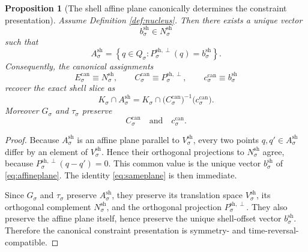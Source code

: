 \documentclass[11pt]{article}
\newcommand{\CoordSpace}[1]{Q_{#1}}
\newcommand{\CoordBody}[1]{K_{#1}}
\newcommand{\ConstraintTarget}[1]{E_{#1}}
\newcommand{\ConstraintMap}[1]{C_{#1}}
\newcommand{\ConstraintValue}[1]{c_{#1}}
\newcommand{\SymGroup}[1]{G_{#1}}
\newcommand{\TimeRev}[1]{\tau_{#1}}
\newcommand{\ShellAffine}[1]{A_{#1}^{\mathrm{sh}}}
\newcommand{\ShellDir}[1]{V_{#1}^{\mathrm{sh}}}
\newcommand{\ShellNormal}[1]{N_{#1}^{\mathrm{sh}}}
\newcommand{\ShellProj}[1]{P_{#1}^{\mathrm{sh},\perp}}
\newcommand{\ShellOffset}[1]{b_{#1}^{\mathrm{sh}}}
\newtheorem{proposition}{Proposition}
\begin{document}
\begin{proposition}[The shell affine plane canonically determines the constraint presentation]
\label{prop:constraint}
Assume Definition \ref{def:nucleus}. Then there exists a unique vector
\[
\ShellOffset{\sigma}\in\ShellNormal{\sigma}
\]
such that
\begin{equation}
\ShellAffine{\sigma}
=
\left\{
q\in\CoordSpace{\sigma}:
\ShellProj{\sigma}(q)=\ShellOffset{\sigma}
\right\}.
\label{eq:affineplane}
\end{equation}
Consequently, the canonical assignments
\begin{equation}
\ConstraintTarget{\sigma}^{\mathrm{can}}
\equiv
\ShellNormal{\sigma},
\qquad
\ConstraintMap{\sigma}^{\mathrm{can}}
\equiv
\ShellProj{\sigma},
\qquad
\ConstraintValue{\sigma}^{\mathrm{can}}
\equiv
\ShellOffset{\sigma}
\label{eq:canonicalconstraint}
\end{equation}
recover the exact shell slice as
\begin{equation}
\CoordBody{\sigma}\cap\ShellAffine{\sigma}
=
\CoordBody{\sigma}\cap
\bigl(\ConstraintMap{\sigma}^{\mathrm{can}}\bigr)^{-1}
\bigl(\ConstraintValue{\sigma}^{\mathrm{can}}\bigr).
\label{eq:sameplane}
\end{equation}
Moreover \(\SymGroup{\sigma}\) and \(\TimeRev{\sigma}\) preserve
\[
\ConstraintMap{\sigma}^{\mathrm{can}}
\quad\text{and}\quad
\ConstraintValue{\sigma}^{\mathrm{can}}.
\]
\end{proposition}

\begin{proof}
Because \(\ShellAffine{\sigma}\) is an affine plane parallel to \(\ShellDir{\sigma}\), every two points \(q,q'\in\ShellAffine{\sigma}\) differ by an element of \(\ShellDir{\sigma}\). Hence their orthogonal projections to \(\ShellNormal{\sigma}\) agree, because \(\ShellProj{\sigma}(q-q')=0\). This common value is the unique vector \(\ShellOffset{\sigma}\) of \eqref{eq:affineplane}. The identity \eqref{eq:sameplane} is then immediate.

Since \(\SymGroup{\sigma}\) and \(\TimeRev{\sigma}\) preserve \(\ShellAffine{\sigma}\), they preserve its translation space \(\ShellDir{\sigma}\), its orthogonal complement \(\ShellNormal{\sigma}\), and the orthogonal projection \(\ShellProj{\sigma}\). They also preserve the affine plane itself, hence preserve the unique shell-offset vector \(\ShellOffset{\sigma}\). Therefore the canonical constraint presentation is symmetry- and time-reversal-compatible.
\end{proof}
\end{document}
